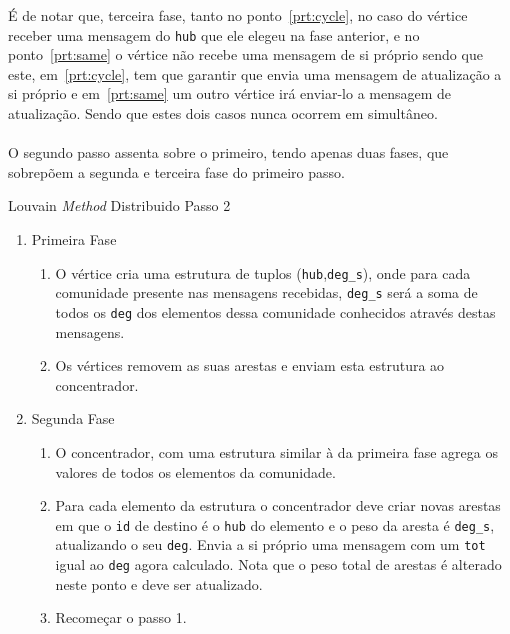 \documentclass[a4paper,10pt]{report}
\begin{document}
É de notar que, terceira fase, tanto no ponto~\ref{prt:cycle}, no caso do vértice receber uma mensagem do \verb|hub| que ele elegeu na fase anterior, e no ponto~\ref{prt:same} o vértice não recebe uma mensagem de si próprio sendo que este, em~\ref{prt:cycle}, tem que garantir que envia uma mensagem de atualização a si próprio e em~\ref{prt:same} um outro vértice irá enviar-lo a mensagem de atualização. Sendo que estes dois casos nunca ocorrem em simultâneo.

\paragraph{}
O segundo passo assenta sobre o primeiro, tendo apenas duas fases, que sobrepõem a segunda e terceira fase do primeiro passo.

\begin{algorithm}[H]
\caption{Louvain \textit{Method} Distribuido Passo 2}
\label{alg:lmdPasso2}
\begin{enumerate}
	\item Primeira Fase
	
	\begin{enumerate}
		\item O vértice cria uma estrutura de tuplos (\verb|hub|,\verb|deg_s|), onde para cada comunidade presente nas mensagens recebidas, \verb|deg_s| será a soma de todos os \verb|deg| dos elementos dessa comunidade conhecidos através destas mensagens.
		\item Os vértices removem as suas arestas e enviam esta estrutura ao concentrador.
	\end{enumerate}
	
	\item Segunda Fase
	
	
	\begin{enumerate}
		\item O concentrador, com uma estrutura similar à da primeira fase agrega os valores de todos os elementos da comunidade.
		\item Para cada elemento da estrutura o concentrador deve criar novas arestas em que o \verb|id| de destino é o \verb|hub| do elemento e o peso da aresta é \verb|deg_s|, atualizando o seu \verb|deg|. Envia a si próprio uma mensagem com um \verb|tot| igual ao \verb|deg| agora calculado. Nota que o peso total de arestas é alterado neste ponto e deve ser atualizado.
		\item Recomeçar o passo 1.
	\end{enumerate}
\end{enumerate}
\end{algorithm}
\end{document}
